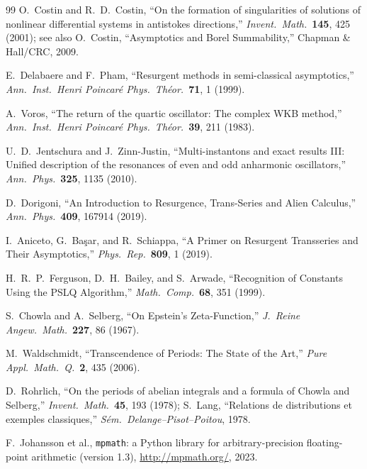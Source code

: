 \documentclass[12pt,a4paper]{article}
\numberwithin{equation}{section}
\theoremstyle{plain}
\theoremstyle{definition}
\theoremstyle{remark}
\begin{document}
\begin{thebibliography}{99}
O.~Costin and R.~D.~Costin,
``On the formation of singularities of solutions of nonlinear
differential systems in antistokes directions,''
\emph{Invent.\ Math.}\ \textbf{145}, 425 (2001);
see also O.~Costin, ``Asymptotics and Borel Summability,''
Chapman \& Hall/CRC, 2009.

E.~Delabaere and F.~Pham,
``Resurgent methods in semi-classical asymptotics,''
\emph{Ann.\ Inst.\ Henri Poincar\'e Phys.\ Th\'eor.}\ \textbf{71}, 1 (1999).

A.~Voros,
``The return of the quartic oscillator: The complex WKB method,''
\emph{Ann.\ Inst.\ Henri Poincar\'e Phys.\ Th\'eor.}\ \textbf{39}, 211 (1983).

U.~D.~Jentschura and J.~Zinn-Justin,
``Multi-instantons and exact results III: Unified description of the
resonances of even and odd anharmonic oscillators,''
\emph{Ann.\ Phys.}\ \textbf{325}, 1135 (2010).

D.~Dorigoni,
``An Introduction to Resurgence, Trans-Series and Alien Calculus,''
\emph{Ann.\ Phys.}\ \textbf{409}, 167914 (2019).

I.~Aniceto, G.~Ba\c{s}ar, and R.~Schiappa,
``A Primer on Resurgent Transseries and Their Asymptotics,''
\emph{Phys.\ Rep.}\ \textbf{809}, 1 (2019).

H.~R.~P.~Ferguson, D.~H.~Bailey, and S.~Arwade,
``Recognition of Constants Using the PSLQ Algorithm,''
\emph{Math.\ Comp.}\ \textbf{68}, 351 (1999).

S.~Chowla and A.~Selberg,
``On Epstein's Zeta-Function,''
\emph{J.\ Reine Angew.\ Math.}\ \textbf{227}, 86 (1967).

M.~Waldschmidt,
``Transcendence of Periods: The State of the Art,''
\emph{Pure Appl.\ Math.\ Q.}\ \textbf{2}, 435 (2006).

D.~Rohrlich,
``On the periods of abelian integrals and a formula of Chowla and Selberg,''
\emph{Invent.\ Math.}\ \textbf{45}, 193 (1978);
S.~Lang,
``Relations de distributions et exemples classiques,''
\emph{S\'em.\ Delange--Pisot--Poitou}, 1978.

F.~Johansson et al.,
\texttt{mpmath}: a Python library for arbitrary-precision floating-point
arithmetic (version 1.3),
\url{http://mpmath.org/}, 2023.

\end{thebibliography}
\end{document}
